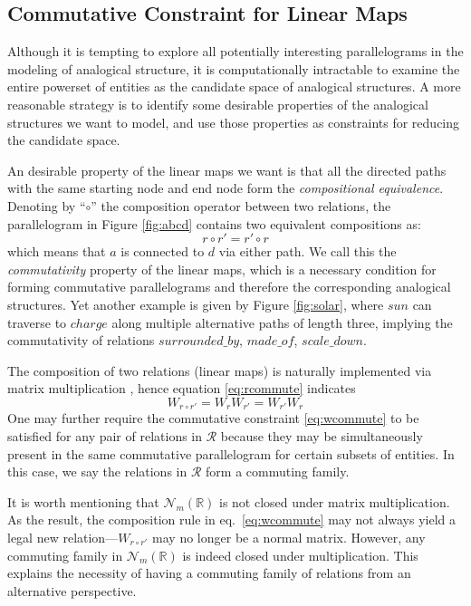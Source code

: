 \documentclass{article}
\begin{document}
\subsection{Commutative Constraint for Linear Maps}
Although it is tempting to explore all potentially interesting parallelograms in the modeling of analogical structure, it is computationally intractable to examine the entire powerset of entities as the candidate space of analogical structures.
A more reasonable strategy is to identify some desirable properties of the analogical structures we want to model,  and use those properties as constraints for reducing the candidate space. 

An desirable property of the linear maps we want is 
that all the directed paths with the same starting node and end node form the \textit{compositional equivalence}.
Denoting by ``$\circ$'' the composition operator between two relations,
the parallelogram in Figure \ref{fig:abcd} contains two  equivalent compositions as:
\begin{equation}
    r \circ r' = r' \circ r
    \label{eq:rcommute}
\end{equation}
which means that $a$ is connected to $d$ via either path.
We call this the \textit{commutativity} property of the linear maps, which is a
necessary condition for forming commutative parallelograms and therefore the corresponding analogical structures.
Yet another example is given by Figure \ref{fig:solar},
where $sun$ can traverse to $charge$ along multiple alternative paths of length three,
implying the commutativity of relations $surrounded\_by$, $made\_of$, $scale\_down$.

The composition of two relations (linear maps) is naturally implemented via matrix multiplication \cite{DBLP:journals/corr/YangYHGD14a, guu2015traversing},
hence equation \eqref{eq:rcommute} indicates
\begin{equation}
    W_{r\circ r'} = W_r W_{r'} = W_{r'} W_r
    \label{eq:wcommute}
\end{equation}
One may further require the commutative constraint \eqref{eq:wcommute} to be satisfied for any pair of relations in $\mathcal{R}$ because they may be simultaneously present in the same commutative parallelogram for certain subsets of entities.
In this case,
we say the relations in $\mathcal{R}$ form a commuting family.




It is worth mentioning that $\mathcal{N}_m(\mathbb{R})$ is not closed under matrix multiplication.
As the result,
the composition rule in eq.\ \eqref{eq:wcommute} may not always yield a legal new relation---$W_{r \circ r'}$ may no longer be a normal matrix.
However,
any commuting family in $\mathcal{N}_m(\mathbb{R})$ is indeed closed under multiplication.
This explains the necessity of having a commuting family of relations from an alternative perspective.
\end{document}
